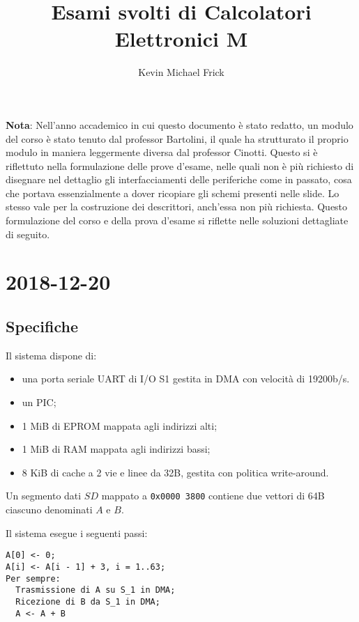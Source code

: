 \documentclass[a4paper]{article}
\title{Esami svolti di Calcolatori Elettronici M}
\author{Kevin Michael Frick}
\begin{document}
\maketitle
\textbf{Nota}: Nell'anno accademico in cui questo documento è stato redatto, un modulo del corso è stato tenuto dal professor Bartolini, il quale ha strutturato il proprio modulo in maniera leggermente diversa dal professor Cinotti.
Questo si è riflettuto nella formulazione delle prove d'esame, nelle quali non è più richiesto di disegnare nel dettaglio gli interfacciamenti delle periferiche come in passato, cosa che portava essenzialmente a dover ricopiare gli schemi presenti nelle slide.
Lo stesso vale per la costruzione dei descrittori, anch'essa non più richiesta.
Questo formulazione del corso e della prova d'esame si riflette nelle soluzioni dettagliate di seguito.
\section{2018-12-20}
\subsection{Specifiche}
Il sistema dispone di:

\begin{itemize}
\item una porta seriale UART di I/O S1 gestita in DMA con velocità di 19200b/s.
\item un PIC;
\item 1 MiB di EPROM mappata agli indirizzi alti;
\item 1 MiB di RAM mappata agli indirizzi bassi;
\item 8 KiB di cache a 2 vie e linee da 32B, gestita con politica write-around.
\end{itemize}

Un segmento dati $SD$ mappato a \texttt{0x0000 3800} contiene due vettori di 64B ciascuno denominati $A$ e $B$.

Il sistema esegue i seguenti passi:
\begin{verbatim}
A[0] <- 0;
A[i] <- A[i - 1] + 3, i = 1..63;
Per sempre:
  Trasmissione di A su S_1 in DMA;
  Ricezione di B da S_1 in DMA;
  A <- A + B
\end{verbatim}
\end{document}
